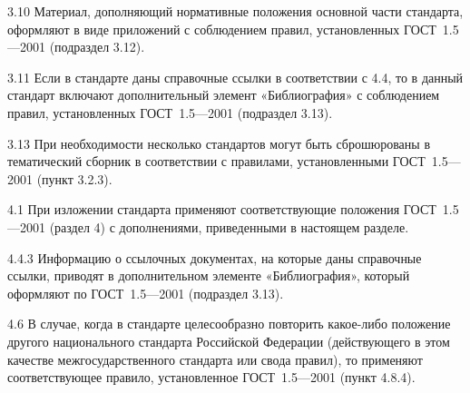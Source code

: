 \documentclass[12pt, twoside, final]{ruost}
\begin{document}
\begin{OST}
					\begin{stdquote}
						\par 3.10 Материал, дополняющий нормативные положения основной части стандарта, оформляют в виде приложений с соблюдением правил, установленных ГОСТ~1.5—2001 (подраздел 3.12).
						\par [ГОСТ Р 1.5---2012]
					\end{stdquote}
					
					\begin{stdquote}
						\par 3.11 Если в стандарте даны справочные ссылки в соответствии с 4.4, то в данный стандарт включают дополнительный элемент «Библиография» с соблюдением правил, установленных ГОСТ~1.5—2001 (подраздел 3.13).
						\par [ГОСТ Р 1.5---2012]
					\end{stdquote}
					
					\begin{stdquote}
						\par 3.13 При необходимости несколько стандартов могут быть сброшюрованы в тематический сборник в соответствии с правилами, установленными ГОСТ~1.5—2001 (пункт 3.2.3).
						\par [ГОСТ Р 1.5---2012]
					\end{stdquote}
					
					\begin{stdquote}
						\par 4.1 При изложении стандарта применяют соответствующие положения ГОСТ~1.5—2001 (раздел 4) с дополнениями, приведенными в настоящем разделе.
						\par [ГОСТ Р 1.5---2012]
					\end{stdquote}
					
					\begin{stdquote}
						\par 4.4.3 Информацию о ссылочных документах, на которые даны справочные ссылки, приводят в дополнительном элементе «Библиография», который оформляют по ГОСТ~1.5—2001 (подраздел 3.13).
						\par [ГОСТ Р 1.5---2012]
					\end{stdquote}
					
					\begin{stdquote}
						\par 4.6 В случае, когда в стандарте целесообразно повторить какое-либо положение другого национального стандарта Российской Федерации (действующего в этом качестве межгосударственного стандарта или свода правил), то применяют соответствующее правило, установленное ГОСТ~1.5—2001 (пункт 4.8.4).
						\par [ГОСТ Р 1.5---2012]
					\end{stdquote}
					

\end{OST}
\end{document}
